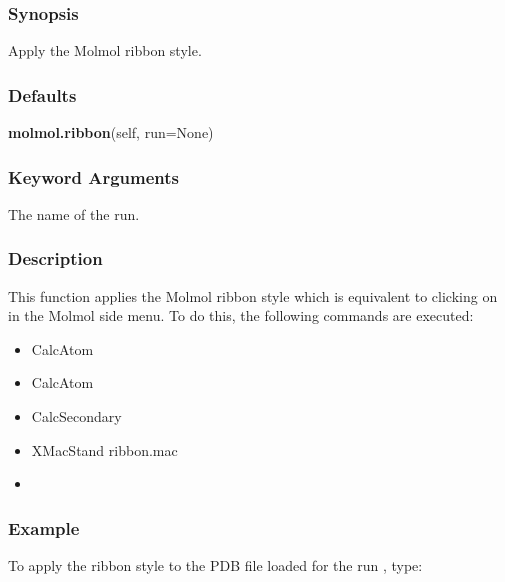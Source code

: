   
 \subsubsection{Synopsis} 

 Apply the Molmol ribbon style. 
  

  
 \subsubsection{Defaults} 

 \textsf{\textbf{molmol.ribbon}(self, run=None)} 

  
 \subsubsection{Keyword Arguments} 

   The name of the run.  

  

  
 \subsubsection{Description} 

 This function applies the Molmol ribbon style which is equivalent to clicking on  in the Molmol side menu.  To do this, the following commands are executed: 
  

 \begin{itemize} 
 \item[] CalcAtom   
 \item[] CalcAtom   
 \item[] CalcSecondary  
 \item[] XMacStand ribbon.mac  
 \item[]  
 \end{itemize} 
  

  
 \subsubsection{Example} 

 To apply the ribbon style to the PDB file loaded for the run , type: 
  


